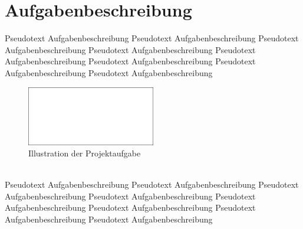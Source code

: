 \chapter{Aufgabenbeschreibung}
\label{sec:Aufgabenbeschreibung}
Pseudotext Aufgabenbeschreibung Pseudotext Aufgabenbeschreibung Pseudotext Aufgabenbeschreibung Pseudotext Aufgabenbeschreibung Pseudotext Aufgabenbeschreibung Pseudotext Aufgabenbeschreibung Pseudotext Aufgabenbeschreibung Pseudotext Aufgabenbeschreibung 
\\[3pt]
%
%
\begin{figure}[htb]
	\centering
		\includegraphics[width=0.5\textwidth]{03_Grafiken/PseudoImage.jpg}
	\caption[Illustration der Projektaufgabe]{Illustration der Projektaufgabe}
	\label{fig:BildAufgabenbeschreibung}
\end{figure}
\\[3pt]
Pseudotext Aufgabenbeschreibung Pseudotext Aufgabenbeschreibung Pseudotext Aufgabenbeschreibung Pseudotext Aufgabenbeschreibung Pseudotext Aufgabenbeschreibung Pseudotext Aufgabenbeschreibung Pseudotext Aufgabenbeschreibung Pseudotext Aufgabenbeschreibung 
